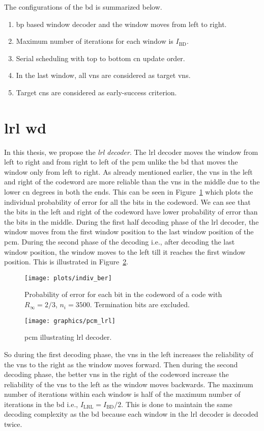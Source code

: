 The configurations of the \ac{bd} is summarized below.
\begin{enumerate}
  \item \ac{bp} based window decoder and the window moves from left to right.
  \item Maximum number of iterations for each window is $I_{\text{BD}}$.
  \item Serial scheduling with top to bottom \ac{cn} update order.
  \item In the last window, all \acp{vn} are considered as target \acp{vn}.
  \item Target \acp{cn} are considered as early-success criterion.
\end{enumerate}

\section{\acl{lrl} \acl{wd}}
In this thesis, we propose the \emph{\ac{lrl} decoder}. The \ac{lrl} decoder moves the window from left to right and from right to left of the \ac{pcm} unlike the \ac{bd} that moves the window only from left to right. As already mentioned earlier, the \acp{vn} in the left and right of the codeword are more reliable than the \acp{vn} in the middle due to the lower \ac{cn} degrees in both the ends. This can be seen in Figure~\ref{fig:indiv_ber} which plots the individual probability of error for all the bits in the codeword. We can see that the bits in the left and right of the codeword have lower probability of error than the bits in the middle. During the first half decoding phase of the \ac{lrl} decoder, the window moves from the first window position to the last window position of the \ac{pcm}. During the second phase of the decoding i.e., after decoding the last window position, the window moves to the left till it reaches the first window position. This is illustrated in Figure~\ref{fig:pcm_lrl}.
\begin{figure}[htbp]
  \centering
  \texttt{[image: plots/indiv\_ber]}
  \caption{Probability of error for each bit in the codeword of a code with $R_\infty=2/3$, $n_i=3500$. Termination bits are excluded.}
  \label{fig:indiv_ber}
\end{figure}

\begin{figure}[htbp]
  \centering
  \texttt{[image: graphics/pcm\_lrl]}
  \caption{\ac{pcm} illustrating \ac{lrl} decoder.}
  \label{fig:pcm_lrl}
\end{figure}
So during the first decoding phase, the \acp{vn} in the left increases the reliability of the \acp{vn} to the right as the window moves forward. Then during the second decoding phase, the better \acp{vn} in the right of the codeword increase the reliability of the \acp{vn} to the left as the window moves backwards. The maximum number of iterations within each window is half of the maximum number of iterations in the \ac{bd} i.e., $I_{\text{LRL}}=I_{\text{BD}}/2$. This is done to maintain the same decoding complexity as the \ac{bd} because each window in the \ac{lrl} decoder is decoded twice.

